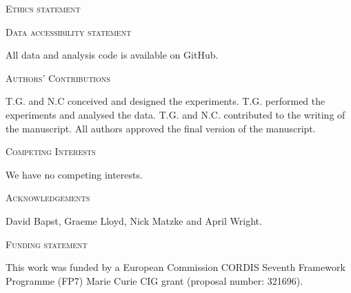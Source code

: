 \documentclass[12pt,letterpaper]{article}
\renewcommand{\section}[1]{%
\bigskip
\begin{center}
\begin{Large}
\normalfont\scshape #1
\medskip
\end{Large}
\end{center}}
\begin{document}
\section{Ethics statement}
\section{Data accessibility statement}
All data and analysis code is available on GitHub.
\section{Authors' Contributions}
T.G. and N.C conceived and designed the experiments. T.G. performed the experiments and analysed the data. T.G. and N.C. contributed to the writing of the manuscript. All authors approved the final version of the manuscript.
\section{Competing Interests}
We have no competing interests.
\section{Acknowledgements}
David Bapst, Graeme Lloyd, Nick Matzke and April Wright.
\section{Funding statement}
This work was funded by a European Commission CORDIS Seventh Framework Programme (FP7) Marie Curie CIG grant (proposal number: 321696).




\newcommand{\beginsupplement}{%
    \setcounter{table}{0}
    \renewcommand{\thetable}{S\arabic{table}}%
    \setcounter{figure}{0}
    \renewcommand{\thefigure}{S\arabic{figure}}%
}
\beginsupplement
%


\end{document}
